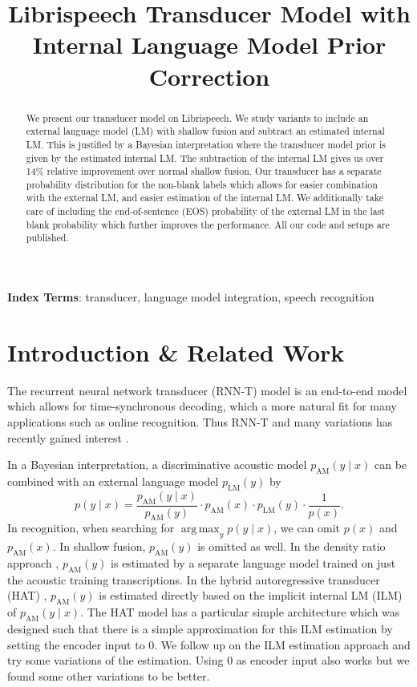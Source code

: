 \documentclass[a4paper]{article}
\title{Librispeech Transducer Model with Internal Language Model Prior Correction}
\DeclareMathOperator*{\argmax}{arg\,max}
\begin{document}
\maketitle
\begin{abstract}
We present our transducer model on Librispeech.
We study variants to include an external language model (LM)
with shallow fusion
and subtract an estimated internal LM.
This is justified by a Bayesian interpretation
where the transducer model prior is given by the estimated internal LM.
The subtraction of the internal LM gives us over 14\% relative improvement
over normal shallow fusion.
Our transducer has a separate probability distribution
for the non-blank labels
which allows for easier combination with the external LM,
and easier estimation of the internal LM.
We additionally take care of including the end-of-sentence (EOS) probability
of the external LM in the last blank probability
which further improves the performance.
All our code and setups are published.
\end{abstract}
\noindent\textbf{Index Terms}: transducer, language model integration, speech recognition

\section{Introduction \& Related Work}

The recurrent neural network transducer (RNN-T) model
\cite{graves2012seqtransduction,graves2013speechrnnt}
is an end-to-end model which allows for time-synchronous decoding,
which a more natural fit for many applications such as online recognition.
Thus
RNN-T and many variations has recently gained interest
\cite{zhang2020trafotransducer,han2020contextnet,gulati2020conformer,variani2020hat,zeyer2020:transducer,zhou2021phonemetransducer}.

In a Bayesian interpretation,
a discriminative acoustic model $p_{\mathrm{AM}}(y \mid x)$
can be combined with an external language model $p_{\mathrm{LM}}(y)$
by
\[ p(y \mid x) =
\frac{p_{\mathrm{AM}}(y \mid x)}{ p_{\mathrm{AM}}(y) }
\cdot p_{\mathrm{AM}}(x) \cdot p_{\mathrm{LM}}(y)
\cdot \frac{1}{p(x)}. \]
In recognition, when searching for $\argmax_{y} p(y\mid x)$,
we can omit $p(x)$ and $p_{\mathrm{AM}}(x)$.
In shallow fusion, $p_{\mathrm{AM}}(y)$ is omitted as well.
In the density ratio approach \cite{mcdermott2019density},
$p_{\mathrm{AM}}(y)$ is estimated by a separate language model
trained on just the acoustic training transcriptions.
In the hybrid autoregressive transducer (HAT) \cite{variani2020hat},
$p_{\mathrm{AM}}(y)$ is estimated directly based on the implicit internal LM (ILM)
of $p_{\mathrm{AM}}(y \mid x)$.
The HAT model has a particular simple architecture
which was designed such that there is a simple approximation
for this ILM estimation by setting the encoder input to 0.
We follow up on the ILM estimation approach
and try some variations of the estimation.
Using 0 as encoder input also works
but we found some other variations to be better.
\end{document}
